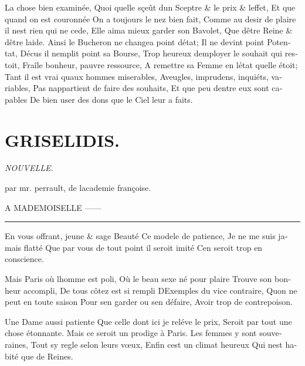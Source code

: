 \documentclass[14pt,a4paper]{memoir}
\begin{document}
\begin{otherlanguage}{french}
{La chose bien examinée,} {Quoi qu\textquotesingle elle sçeût
d\textquotesingle un Sceptre \& le prix \& l\textquotesingle effet,} {Et
que quand on est couronnée} {On a toujours le nez bien fait,} {Comme au
desir de plaire il n\textquotesingle est rien qui ne cede,} {Elle aima
mieux garder son Bavolet,} {Que d\textquotesingle être Reine \&
d\textquotesingle être laide.} {Ainsi le Bucheron ne changea point
d\textquotesingle état;} {Il ne devint point Potentat,}
{D\textquotesingle écus il n\textquotesingle emplit point sa Bourse,}
{Trop heureux d\textquotesingle employer le souhait qui restoit, }
{Fraîle bonheur, pauvre ressource,} {A remettre sa Femme en
l\textquotesingle état qu\textquotesingle elle étoit;} {Tant il est vrai
qu\textquotesingle aux hommes miserables,} {Aveugles, imprudens,
inquiéts, variables,} {Pas n\textquotesingle appartient de faire des
souhaits,} {Et que peu d\textquotesingle entre eux sont capables} {De
bien user des dons que le Ciel leur a faits. }

\section{GRISELIDIS.}

\emph{NOUVELLE.}

{par mr. perrault, de l\textquotesingle academie françoise.}

A MADEMOISELLE ------

\begin{center}\rule{0.5\linewidth}{0.5pt}\end{center}

{En vous offrant, jeune \& sage Beauté} {Ce modele de patience,} {Je ne
me suis jamais flatté} {Que par vous de tout point il seroit imité}
{C\textquotesingle en seroit trop en conscience.}

{Mais Paris où l\textquotesingle homme est poli,} {Où le beau sexe né
pour plaire} {Trouve son bonheur accompli,} {De tous côtez est si
rempli} {D\textquotesingle Exemples du vice contraire,}
{Qu\textquotesingle on ne peut en toute saison} {Pour
s\textquotesingle en garder ou s\textquotesingle en défaire,} {Avoir
trop de contrepoison.}

{Une Dame aussi patiente} {Que celle dont ici je reléve le prix,}
{Seroit par tout une chose étonnante.} {Mais ce seroit un prodige à
Paris.} {Les femmes y sont souveraines,} {Tout s\textquotesingle y regle
selon leurs vœux,} {Enfin c\textquotesingle est un climat heureux} {Qui
n\textquotesingle est habité que de Reines.}


\end{otherlanguage}
\end{document}
